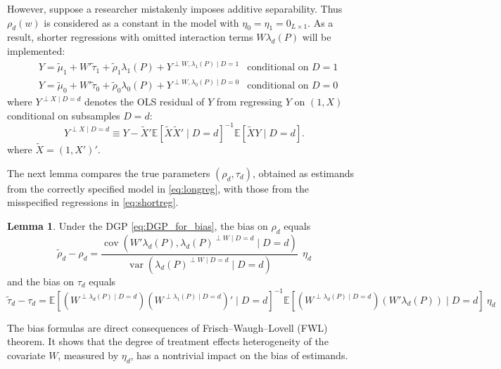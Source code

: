 \documentclass[11pt]{article}
\theoremstyle{definition}
\newtheorem{lemma}{Lemma}[section]
\DeclareMathOperator{\cov}{cov}
\DeclareMathOperator{\var}{var}
\newcommand{\Exp}{\ensuremath{\mathbb{E}}} %
\newcommand{\0}{\ensuremath{\mathbf{0}}}
\begin{document}
\begin{bibunit}
However, suppose a researcher mistakenly imposes additive separability. Thus $\rho_d(w)$ is considered as a constant in the model with $\eta_0 = \eta_1 = 0_{L\times 1}$. As a result, shorter regressions with omitted interaction terms $W\lambda_d(P)$ will be implemented: 
\begin{equation}
\label{eq:shortreg}
\begin{aligned}
    &Y = \tilde{\mu}_1 +  W'\tilde{\tau}_1 + \tilde{\rho}_1 \lambda_1(P) + Y^{\perp W, \lambda_1(P)\mid D=1}  &\text{conditional on } D = 1\\
    &Y = \tilde{\mu}_0 +  W'\tilde{\tau}_0 + \tilde{\rho}_0 \lambda_0(P) + Y^{\perp W, \lambda_0(P)\mid D=0} &\text{conditional on } D = 0
\end{aligned}
\end{equation}
where $Y^{\perp X\mid D=d}$ denotes the OLS residual of $Y$ from regressing $Y$ on $(1,X)$ conditional on subsamples $D=d$:
\[
    Y^{\perp X\mid D=d} \equiv Y - \tilde{X}'\Exp[\tilde{X}\tilde{X}'\mid D=d]^{-1}\Exp[\tilde{X}Y\mid D=d].
\]
where $\tilde{X} = (1,X')'$.

The next lemma compares the true parameters $(\rho_d, \tau_d)$, obtained as estimands from the correctly specified model in \eqref{eq:longreg}, with those from the misspecified regressions in \eqref{eq:shortreg}. 

\begin{lemma}
    \label{lem:bias_formula_general}
    Under the DGP \eqref{eq:DGP_for_bias}, the bias on $\rho_d$ equals 
    \begin{equation}
    \label{eq:bias_rho_general}
        \tilde{\rho}_d - \rho_d = \frac{\cov(W'\lambda_d(P), \lambda_d(P)^{\perp W\mid D=d} \mid D=d)}{\var(\lambda_d(P)^{\perp W\mid D=d}\mid D=d)} ~~\eta_d
    \end{equation}
    and the bias on $\tau_d$ equals 
    \begin{equation}
    \label{eq:bias_tau_general}
        \tilde{\tau}_d - \tau_d = \Exp[(W^{\perp \lambda_d(P)\mid D=d})(W^{\perp \lambda_1(P)\mid D=d})'\mid D=d]^{-1}\Exp[(W^{\perp \lambda_d(P)\mid D=d})(W'\lambda_d(P))\mid D=d]~\eta_d
    \end{equation}
\end{lemma}

The bias formulas are direct consequences of Frisch–Waugh–Lovell (FWL) theorem. It shows that the degree of treatment effects heterogeneity of the covariate $W$, measured by $\eta_d$, has a nontrivial impact on the bias of estimands. 


\end{bibunit}
\end{document}
